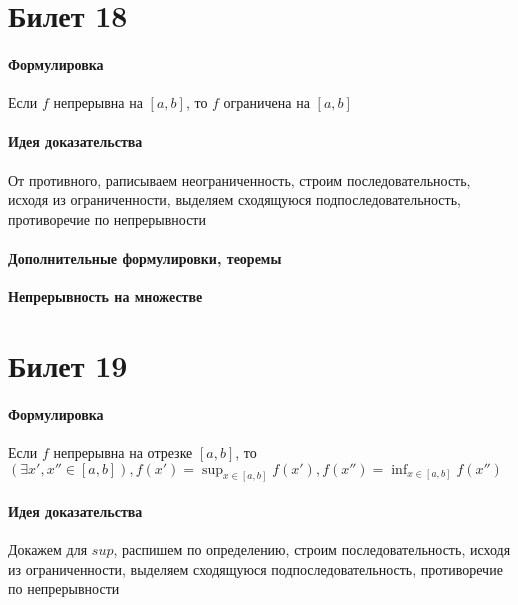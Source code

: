 \documentclass[a4paper,10pt]{article}
\begin{document}
	\section{Билет 18}
	\begin{center} 
		\item \paragraph{Формулировка} 
	\end{center}
	Если $f$ непрерывна на $[a, b]$, то $f$ ограничена на $[a, b]$
	\begin{center} 
		\item \paragraph{Идея доказательства} 
	\end{center}
	От противного, раписываем неограниченность, строим последовательность, исходя из ограниченности, выделяем сходящуюся подпоследовательность, противоречие по непрерывности
	\begin{center} 
		\item \paragraph{Дополнительные формулировки, теоремы} 
	\end{center}
	\textbf{Непрерывность на множестве}
	\section{Билет 19}
	\begin{center} 
		\item \paragraph{Формулировка} 
	\end{center}
	Если $f$ непрерывна на отрезке $[a, b]$, то $(\exists x',x'' \in [a,b]), f(x')=\sup_{x \in [a,b]}f(x'), f(x'')=\inf_{x \in [a,b]}f(x'')$
	\begin{center} 
		\item \paragraph{Идея доказательства} 
	\end{center}
	Докажем для $sup$, распишем по определению, строим последовательность, исходя из ограниченности, выделяем сходящуюся подпоследовательность, противоречие по непрерывности
\end{document}
